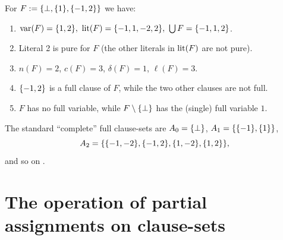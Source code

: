 \documentclass[]{book}
\begin{document}
\begin{examp}\label{exp:measurecls}
  For $F := \{ \bot, \{ 1 \},\{ -1,2 \} \}$ we have:
  \begin{enumerate}
  \item $\operatorname{var}(F) = \{1, 2\},\ \operatorname{lit}(F) = \{- 1, 1,- 2, 2\},\ \bigcup F = \{-1, 1, 2\}$.
  \item Literal 2 is pure for $F$ (the other literals in $\operatorname{lit}(F)$ are not pure).
  \item $n(F) = 2$, $c(F) = 3$, $\delta(F) = 1$, $\ell(F) = 3$.
  \item $\{ -1,2 \}$ is a full clause of $F$, while the two other clauses are not full.
  \item $F$ has no full variable, while $F \setminus \{ \bot \}$ has the (single) full variable $1$.
  \end{enumerate}
  The standard ``complete'' full clause-sets are $A_0 = \{ \bot \}$, $A_1 = \{ \{ -1 \},\{ 1 \} \}$,
  \begin{displaymath}
    A_2 = \{ \{ -1,-2 \},\{ -1,2 \},\{ 1,-2 \},\{ 1,2 \} \},
  \end{displaymath}
  and so on \cite{h12}.
\end{examp}
\section{The operation of partial assignments on clause-sets}
\label{sec:oppasscls}
\end{document}
